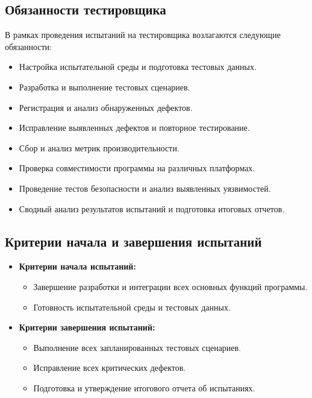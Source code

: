 \documentclass{article}
\begin{document}
    \subsection{Обязанности тестировщика}

    В рамках проведения испытаний на тестировщика возлагаются следующие обязанности:

    \begin{itemize}
        \item Настройка испытательной среды и подготовка тестовых данных.
        \item Разработка и выполнение тестовых сценариев.
        \item Регистрация и анализ обнаруженных дефектов.
        \item Исправление выявленных дефектов и повторное тестирование.
        \item Сбор и анализ метрик производительности.
        \item Проверка совместимости программы на различных платформах.
        \item Проведение тестов безопасности и анализ выявленных уязвимостей.
        \item Сводный анализ результатов испытаний и подготовка итоговых отчетов.
    \end{itemize}

    \subsection{Критерии начала и завершения испытаний}

    \begin{itemize}
        \item \textbf{Критерии начала испытаний:}
        \begin{itemize}
            \item Завершение разработки и интеграции всех основных функций программы.
            \item Готовность испытательной среды и тестовых данных.
        \end{itemize}
        \item \textbf{Критерии завершения испытаний:}
        \begin{itemize}
            \item Выполнение всех запланированных тестовых сценариев.
            \item Исправление всех критических дефектов.
            \item Подготовка и утверждение итогового отчета об испытаниях.
        \end{itemize}
    \end{itemize}
\end{document}
